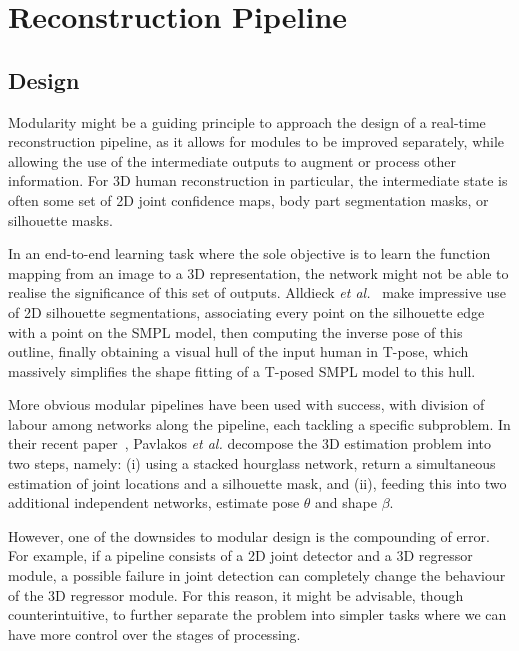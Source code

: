 \documentclass[9pt,twocolumn]{article}
\begin{document}

\section{Reconstruction Pipeline}

	\subsection{Design}
	
		\par{Modularity might be a guiding principle to approach the design of a real-time reconstruction
		pipeline, as it allows for modules to be improved separately, while allowing the use of the intermediate
		outputs to augment or process other information. For 3D human reconstruction in particular, the intermediate
		state is often some set of 2D joint confidence maps, body part segmentation masks, or silhouette masks.}

		\par{In an end-to-end learning task where the sole objective is to learn the function mapping from an image
		to a 3D representation, the network might not be able to realise the significance of this set of outputs.
		Alldieck \textit{et al.}~\cite{avatars} make impressive use of 2D silhouette segmentations, associating
		every point on the silhouette edge with a point on the SMPL model, then computing the inverse pose of this
		outline, finally obtaining a visual hull of the input human in T-pose, which massively simplifies the shape
		fitting of a T-posed SMPL model to this hull.}

		\par{More obvious modular pipelines have been used with success, with division of labour among networks along
		the pipeline, each tackling a specific subproblem. In their recent paper~\cite{humanshape}, Pavlakos \textit{et al.}
		decompose the 3D estimation problem into two steps,	namely: (i) using a stacked hourglass network, return a
		simultaneous estimation of joint locations and a silhouette mask, and (ii), feeding this into two additional
		independent networks, estimate pose $\theta$ and shape $\beta$.}

		\par{However, one of the downsides to modular design is the compounding of error. For example, if a pipeline
		consists of a 2D joint detector and a 3D regressor module, a possible failure in joint detection can completely
		change the behaviour of the 3D regressor module. For this reason, it might be advisable, though counterintuitive,
		to further separate the problem into simpler tasks where we can have more control over the stages of processing.}
\end{document}
